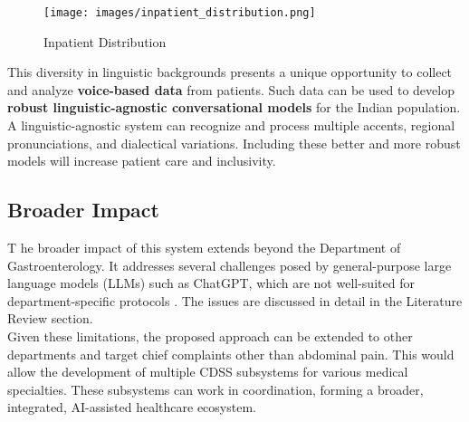 \begin{figure}[h]
    \centering
    \texttt{[image: images/inpatient\_distribution.png]}
    \caption{Inpatient Distribution}
    \label{fig:inpatient_distribution}
\end{figure}

\noindent This diversity in linguistic backgrounds presents a unique opportunity to collect and analyze \textcolor{TUMRed}{\textbf{voice-based data}} from patients. Such data can be used to develop \textcolor{TUMRed}{\textbf{robust linguistic-agnostic conversational models}} for the Indian population. A linguistic-agnostic system can recognize and process multiple accents, regional pronunciations, and dialectical variations. Including these better and more robust models will increase patient care and inclusivity.

\subsection{Broader Impact}
\lettrine{T}{ }he broader impact of this system extends beyond the Department of Gastroenterology. It addresses several challenges posed by general-purpose large language models (LLMs) such as ChatGPT, which are not well-suited for department-specific protocols \cite{clusmann2023future}. The issues are discussed in detail in the Literature Review section.\\[\baselineskip]

\noindent Given these limitations, the proposed approach can be extended to other departments and target chief complaints other than abdominal pain. This would allow the development of multiple CDSS subsystems for various medical specialties. These subsystems can work in coordination, forming a broader, integrated, AI-assisted healthcare ecosystem.\\[\baselineskip]